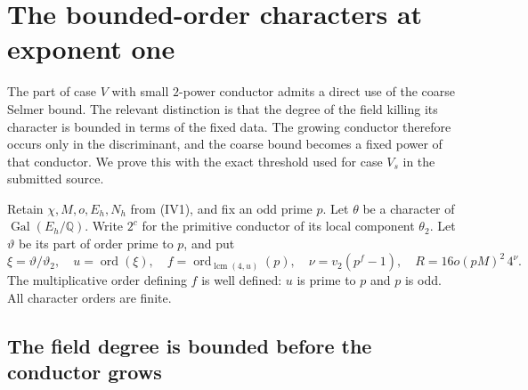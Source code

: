\section{The bounded-order characters at exponent one}
\label{sv-section}

The part of case $V$ with small $2$-power conductor admits a
direct use of the coarse Selmer bound. The relevant distinction
is that the degree of the field killing its character is bounded
in terms of the fixed data. The growing conductor therefore
occurs only in the discriminant, and the coarse bound becomes a
fixed power of that conductor. We prove this with the exact
threshold used for case $V_s$ in the submitted source.
\cite{alpo-uniform-source}

Retain $\chi,M,o,E_h,N_h$ from (IV1), and fix an odd prime $p$.
Let $\theta$ be a character of $\operatorname{Gal}(E_h/\mathbb Q)$.
Write $2^c$ for the primitive conductor of its local component
$\theta_2$. Let $\vartheta$ be its part of order prime to $p$,
and put
\[
 \xi=\vartheta/\vartheta_2,\quad
 u=\operatorname{ord}(\xi),\quad
 f=\operatorname{ord}_{\operatorname{lcm}(4,u)}(p),\quad
 \nu=v_2(p^f-1),\quad
 R=16o(pM)^2\,4^\nu.
                                                               \tag{SV1}
\]
The multiplicative order defining $f$ is well defined: $u$ is
prime to $p$ and $p$ is odd. All character orders are finite.

\subsection{The field degree is bounded before the conductor grows}

